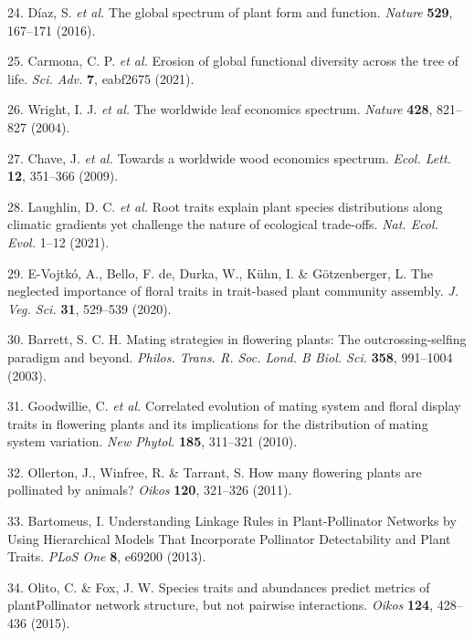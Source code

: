 \documentclass[12pt,a4paper,]{article}
\begin{document}
\hypertarget{ref-diaz2016}{}
24. Díaz, S. \emph{et al.} The global spectrum of plant form and
function. \emph{Nature} \textbf{529}, 167--171 (2016).

\hypertarget{ref-carmona2021}{}
25. Carmona, C. P. \emph{et al.} Erosion of global functional diversity
across the tree of life. \emph{Sci. Adv.} \textbf{7}, eabf2675 (2021).

\hypertarget{ref-wright2004}{}
26. Wright, I. J. \emph{et al.} The worldwide leaf economics spectrum.
\emph{Nature} \textbf{428}, 821--827 (2004).

\hypertarget{ref-chave2009}{}
27. Chave, J. \emph{et al.} Towards a worldwide wood economics spectrum.
\emph{Ecol. Lett.} \textbf{12}, 351--366 (2009).

\hypertarget{ref-laughlin2021}{}
28. Laughlin, D. C. \emph{et al.} Root traits explain plant species
distributions along climatic gradients yet challenge the nature of
ecological trade-offs. \emph{Nat. Ecol. Evol.} 1--12 (2021).

\hypertarget{ref-evojtko2020}{}
29. E-Vojtkó, A., Bello, F. de, Durka, W., Kühn, I. \& Götzenberger, L.
The neglected importance of floral traits in trait-based plant community
assembly. \emph{J. Veg. Sci.} \textbf{31}, 529--539 (2020).

\hypertarget{ref-barrett2003}{}
30. Barrett, S. C. H. Mating strategies in flowering plants: The
outcrossing-selfing paradigm and beyond. \emph{Philos. Trans. R. Soc.
Lond. B Biol. Sci.} \textbf{358}, 991--1004 (2003).

\hypertarget{ref-goodwillie2010}{}
31. Goodwillie, C. \emph{et al.} Correlated evolution of mating system
and floral display traits in flowering plants and its implications for
the distribution of mating system variation. \emph{New Phytol.}
\textbf{185}, 311--321 (2010).

\hypertarget{ref-ollerton2011}{}
32. Ollerton, J., Winfree, R. \& Tarrant, S. How many flowering plants
are pollinated by animals? \emph{Oikos} \textbf{120}, 321--326 (2011).

\hypertarget{ref-bartomeus2013}{}
33. Bartomeus, I. Understanding Linkage Rules in Plant-Pollinator
Networks by Using Hierarchical Models That Incorporate Pollinator
Detectability and Plant Traits. \emph{PLoS One} \textbf{8}, e69200
(2013).

\hypertarget{ref-olito2015}{}
34. Olito, C. \& Fox, J. W. Species traits and abundances predict
metrics of plantPollinator network structure, but not pairwise
interactions. \emph{Oikos} \textbf{124}, 428--436 (2015).
\end{document}
